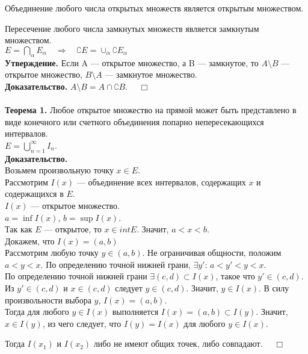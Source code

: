 \documentclass[12pt,a4paper, titlepage]{article}
\begin{document}
Объединение любого числа открытых множеств является открытым множеством.

Пересечение любого числа замкнутых множеств является замкнутым множеством.\\

$E = \bigcap_{\alpha} E_{\alpha} \quad \Rightarrow \quad \complement E = \cup_{\alpha} \complement E_{\alpha}$\\

\textbf{Утверждение.} Если A --- открытое множество, а B --- замкнутое, то $A \setminus B$ --- открытое множество, $B \setminus A$ --- замкнутое множество.\\
\textbf{Доказательство.} $A \setminus B = A \cap \complement B$. $\quad \Box$\\ \\

\textbf{Теорема 1.}
Любое открытое множество на прямой может быть представлено в виде конечного или счетного объединения попарно непересекающихся интервалов.\\
$E = \bigcup\limits_{n=1}^{\infty}I_n$. \\
\textbf{Доказательство.} \\
Возьмем произвольную точку $x \in E$. \\
Рассмотрим $I(x)$ --- объединение всех интервалов, содержащих $x$ и содержащихся в $E$.\\
$I(x)$ --- открытое множество. \\
$a = \inf I(x)$, $b = \sup I(x)$. \\
Так как $E$ --- открытое, то $x \in int E$. Значит, $a < x < b$. \\

Докажем, что $I(x) = (a, b)$ \\
Рассмотрим любую точку $y \in (a, b)$. Не ограничивая общности, положим $a < y < x$.
По определению точной нижней грани, $\exists y'$: $a < y' < y < x$.\\
По определению точной нижней грани $\exists (c, d) \subset I(x)$, такое что $y' \in (c, d)$. \\
Из $y' \in (c, d)$ и $x \in (c,d)$ следует $y \in (c,d)$. Значит, $y \in I(x)$. В силу произвольности выбора $y$, $I(x) = (a, b)$.\\

Тогда для любого $y \in I(x)$ выполняется $I(x) = (a, b) \subset I(y)$. Значит, $x \in I(y)$, из чего следует, что $I(y) = I(x)$ для любого $y \in I(x)$.

Тогда $I(x_1)$ и $I(x_2)$ либо не имеют общих точек, либо совпадают.
$\quad \Box$\\ \\
\end{document}
